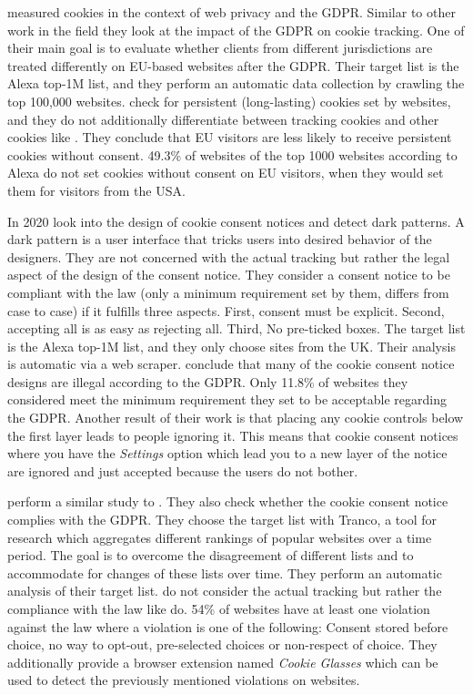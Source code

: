  measured cookies in the context of web privacy and the GDPR. Similar to other work in the
field they look at the impact of the GDPR on cookie tracking. One of their main goal is to evaluate whether clients from
different jurisdictions are treated differently on EU-based websites after the GDPR. Their target list is the Alexa
top-1M list, and they perform an automatic data collection by crawling the top 100,000 websites.
\citeauthor{dabrowski2019measuring} check for persistent (long-lasting) cookies set by websites, and they do not
additionally differentiate between tracking cookies and other cookies like . They conclude that EU
visitors are less likely to receive persistent cookies without consent. 49.3\% of websites of the top 1000 websites
according to Alexa do not set cookies without consent on EU visitors, when they would set them for visitors from the USA.

In 2020  look into the design of cookie consent notices and detect dark patterns. A dark pattern is
a user interface that tricks users into desired behavior of the designers. They are not
concerned with the actual tracking but rather the legal aspect of the design of the consent notice. They consider a
consent notice to be compliant with the law (only a minimum requirement set by them, differs from case to case) if it
fulfills three aspects. First, consent must be explicit. Second, accepting all is as easy as rejecting all. Third, No
pre-ticked boxes. The target list is
the Alexa top-1M list, and they only choose sites from the UK. Their analysis is automatic via a web scraper.
\citeauthor{nouwens2020dark} conclude that many of the cookie consent notice designs are illegal according to the GDPR.
Only 11.8\% of websites they considered meet the minimum requirement they set to be acceptable regarding the GDPR.
Another result of their work is that placing any cookie controls below the first layer leads to people ignoring it. This
means that cookie consent notices where you have the \emph{Settings} option which lead you to a new layer of the notice
are ignored and just accepted because the users do not bother.

 perform a similar study to . They also check whether the cookie consent notice
complies with the GDPR. They choose the target list with Tranco, a tool for research which aggregates different rankings
of popular websites over a time period. The goal is to overcome the disagreement of different lists and to accommodate
for changes of these lists over time. They perform an automatic analysis of their target list.
\citeauthor{matte2020cookie} do not consider the actual tracking but rather the compliance with the law
like \citeauthor{nouwens2020dark} do. 54\% of websites have at least one violation against the law where a violation is
one of the following: Consent stored before choice, no way to opt-out, pre-selected choices or non-respect of choice.
They additionally provide a browser extension named \emph{Cookie Glasses} which can be used to detect the previously
mentioned violations on websites.

